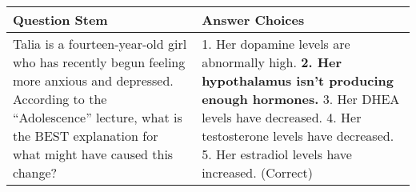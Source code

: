 \documentclass[
]{article}
\begin{document}
\begin{longtable}[]{@{}ll@{}}
\toprule
\begin{minipage}[b]{0.30\columnwidth}\raggedright
\textbf{Question Stem}\strut
\end{minipage} & \begin{minipage}[b]{0.64\columnwidth}\raggedright
\textbf{Answer Choices}\strut
\end{minipage}\tabularnewline
\midrule
\endhead
\begin{minipage}[t]{0.30\columnwidth}\raggedright
Talia is a fourteen-year-old girl who has recently begun feeling more anxious and depressed. According to the ``Adolescence'' lecture, what is the BEST explanation for what might have caused this change?\strut
\end{minipage} & \begin{minipage}[t]{0.64\columnwidth}\raggedright
1. Her dopamine levels are abnormally high. \textbf{2. Her hypothalamus isn't producing enough hormones.} 3. Her DHEA levels have decreased. 4. Her testosterone levels have decreased. 5. Her estradiol levels have increased. (Correct)\strut
\end{minipage}\tabularnewline
\bottomrule
\end{longtable}
\end{document}
